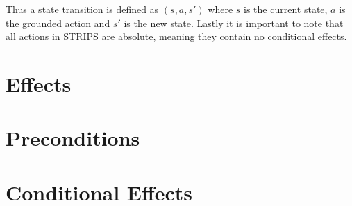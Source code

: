 \documentclass[master.tex]{subfiles}
\begin{document}
    Thus a state transition is defined as $(s,a,s')$ where $s$ is the
    current state, $a$ is the grounded action and $s'$ is the new state.
    Lastly it is important to note that all actions in STRIPS are absolute,
    meaning they contain no conditional effects.

\section{Effects}


\section{Preconditions}


\section{Conditional Effects}

\end{document}
